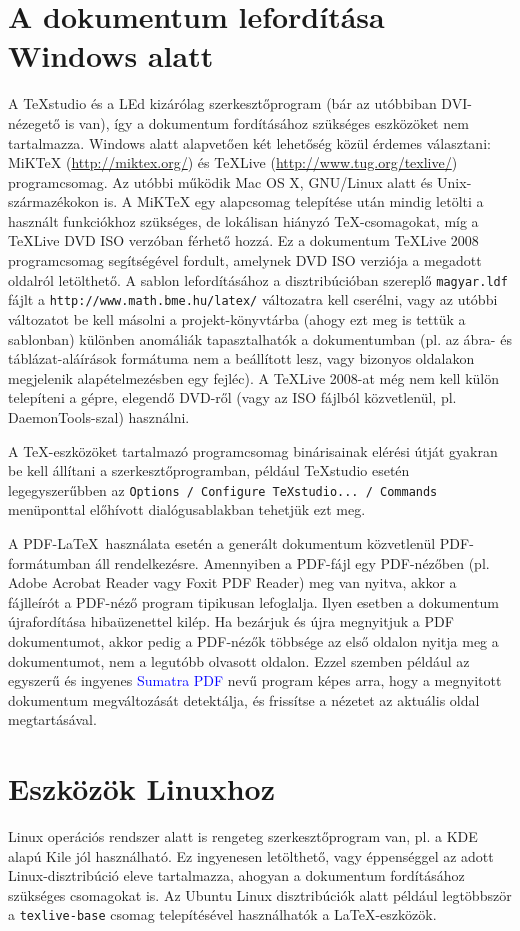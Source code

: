 \section{A dokumentum lefordítása Windows alatt}
A TeXstudio és a LEd kizárólag szerkesztőprogram (bár az utóbbiban DVI-nézegető is van), így a dokumentum fordításához szükséges eszközöket nem tartalmazza. Windows alatt alapvetően két lehetőség közül érdemes választani: MiKTeX (\url{http://miktex.org/}) és TeXLive (\url{http://www.tug.org/texlive/}) programcsomag. Az utóbbi működik Mac OS X, GNU/Linux alatt és Unix-származékokon is. A MiKTeX egy alapcsomag telepítése után mindig letölti a használt funkciókhoz szükséges, de lokálisan hiányzó \TeX-csomagokat, míg a TeXLive DVD ISO verzóban férhető hozzá. Ez a dokumentum TeXLive 2008 programcsomag segítségével fordult, amelynek DVD ISO verziója a megadott oldalról letölthető. A sablon lefordításához a disztribúcióban szereplő \verb+magyar.ldf+ fájlt a \verb+http://www.math.bme.hu/latex/+ változatra kell cserélni, vagy az utóbbi változatot be kell másolni a projekt-könyvtárba (ahogy ezt meg is tettük a sablonban) különben anomáliák tapasztalhatók a dokumentumban (pl. az ábra- és táblázat-aláírások formátuma nem a beállított lesz, vagy bizonyos oldalakon megjelenik alapételmezésben egy fejléc). A TeXLive 2008-at még nem kell külön telepíteni a gépre, elegendő DVD-ről (vagy az ISO fájlból közvetlenül, pl. DaemonTools-szal) használni. 

A \TeX-eszközöket tartalmazó programcsomag binárisainak elérési útját gyakran be kell állítani a szerkesztőprogramban, például TeXstudio esetén legegyszerűbben az \verb+Options / Configure TeXstudio... / Commands+ menüponttal előhívott dialógusablakban tehetjük ezt meg.

A PDF-\LaTeX~használata esetén a generált dokumentum közvetlenül PDF-formátumban áll rendelkezésre. Amennyiben a PDF-fájl egy PDF-nézőben (pl. Adobe Acrobat Reader vagy Foxit PDF Reader) meg van nyitva, akkor a fájlleírót a PDF-néző program tipikusan lefoglalja. Ilyen esetben a dokumentum újrafordítása hibaüzenettel kilép. Ha bezárjuk és újra megnyitjuk a PDF dokumentumot, akkor pedig a PDF-nézők többsége az első oldalon nyitja meg a dokumentumot, nem a legutóbb olvasott oldalon. Ezzel szemben például az egyszerű és ingyenes \textcolor{blue}{Sumatra PDF} nevű program képes arra, hogy a megnyitott dokumentum megváltozását detektálja, és frissítse a nézetet az aktuális oldal megtartásával.

\section{Eszközök Linuxhoz}
Linux operációs rendszer alatt is rengeteg szerkesztőprogram van, pl. a KDE alapú Kile jól használható. Ez ingyenesen letölthető, vagy éppenséggel az adott Linux-disztribúció eleve tartalmazza, ahogyan a dokumentum fordításához szükséges csomagokat is. Az Ubuntu Linux disztribúciók alatt például legtöbbször a \verb+texlive-base+ csomag telepítésével használhatók a \LaTeX-eszközök.
